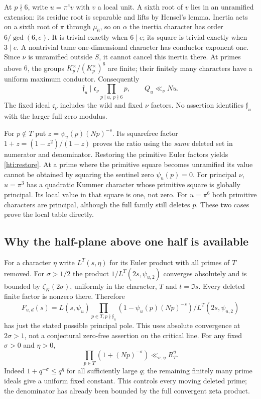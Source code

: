 \documentclass[11pt,oneside,openany]{book}
\theoremstyle{definition}\newtheorem{definition}[theorem]{Definition}
\theoremstyle{remark}\newtheorem{remark}[theorem]{Remark}
\begin{document}
At $p\nmid6$, write $u=\pi^e v$ with $v$ a local unit. A sixth root of
$v$ lies in an unramified extension: its residue root is separable and
lifts by Hensel's lemma. Inertia acts on a sixth root of $\pi$ through
$\mu_6$, so on $\alpha$ the inertia character has order
$6/\gcd(6,e)$. It is trivial exactly when $6\mid e$; its square is
trivial exactly when $3\mid e$. A nontrivial tame one-dimensional
character has conductor exponent one. Since $\nu$ is unramified outside
$S$, it cannot cancel this inertia there. At primes above $6$, the groups
$K_p^\times/(K_p^\times)^6$ are finite; their finitely many characters
have a uniform maximum conductor. Consequently
\[
 \mathfrak f_u\mid \mathfrak c_\nu
       \prod_{p\mid u,\ p\nmid6}p,\qquad
 Q_u\ll_\nu Nu.
\]
The fixed ideal $\mathfrak c_\nu$ includes the wild and fixed $\nu$ factors.
No assertion identifies $\mathfrak f_u$ with the larger full zero modulus.

For $p\notin T$ put $z=\psi_u(p)(Np)^{-s}$. Its squarefree factor
$1+z=(1-z^2)/(1-z)$ proves the ratio using the \emph{same} deleted set
in numerator and denominator. Restoring the primitive Euler factors yields
\eqref{hti:restore}. At a prime where the primitive square becomes
unramified its value cannot be obtained by squaring the sentinel zero
$\psi_u(p)=0$. For principal $\nu$, $u=\pi^3$ has a quadratic Kummer character
whose primitive square is globally principal. Its local value in that
square is one, not zero. For $u=\pi^6$ both primitive characters are
principal, although the full family still deletes $p$. These two cases
prove the local table directly.

\subsection{Why the half-plane above one half is available}
For a character $\eta$ write $L^T(s,\eta)$ for its Euler product with
all primes of $T$ removed. For $\sigma>1/2$ the product
$1/L^T(2s,\psi_{u,2})$ converges absolutely and is bounded by
$\zeta_K(2\sigma)$, uniformly in the character, $T$ and $t=\Im s$.
Every deleted finite factor is nonzero there. Therefore
\[
 F_{u,d}(s)=L(s,\psi_u)
  \prod_{p\in T,p\nmid\mathfrak f_u}(1-\psi_u(p)(Np)^{-s})
  \big/L^T(2s,\psi_{u,2})
\]
has just the stated possible principal pole. This uses absolute convergence
at $2\sigma>1$, not a conjectural zero-free assertion on the critical line.
For any fixed $\sigma>0$ and $\eta>0$,
\[
 \prod_{p\in T}(1+(Np)^{-\sigma})\ll_{\sigma,\eta}R_T^\eta.
\]
Indeed $1+q^{-\sigma}\le q^\eta$ for all sufficiently large $q$;
the remaining finitely many prime ideals give a uniform fixed constant.
This controls every moving deleted prime; the denominator has already
been bounded by the full convergent zeta product.
\end{document}
